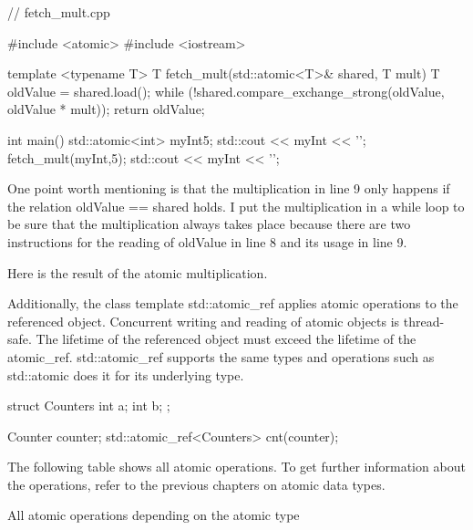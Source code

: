 
\begin{cpp}
// fetch_mult.cpp

#include <atomic>
#include <iostream>

template <typename T>
T fetch_mult(std::atomic<T>& shared, T mult){
	T oldValue = shared.load();
	while (!shared.compare_exchange_strong(oldValue, oldValue * mult));
	return oldValue;
}

int main(){
	std::atomic<int> myInt{5};
	std::cout << myInt << '\n';
	fetch_mult(myInt,5);
	std::cout << myInt << '\n';
}
\end{cpp}

One point worth mentioning is that the multiplication in line 9 only happens if the relation oldValue == shared holds. I put the multiplication in a while loop to be sure that the multiplication always takes place because there are two instructions for the reading of oldValue in line 8 and its usage in line 9.

Here is the result of the atomic multiplication.



Additionally, the class template std::atomic\_ref applies atomic operations to the referenced object. Concurrent writing and reading of atomic objects is thread-safe. The lifetime of the referenced object must exceed the lifetime of the atomic\_ref. std::atomic\_ref supports the same types and operations such as std::atomic does it for its underlying type.

\begin{cpp}
struct Counters {
	int a;
	int b;
};

Counter counter;
std::atomic_ref<Counters> cnt(counter);
\end{cpp}


The following table shows all atomic operations. To get further information about the operations, refer to the previous chapters on atomic data types.

\begin{center}
All atomic operations depending on the atomic type
\end{center}

